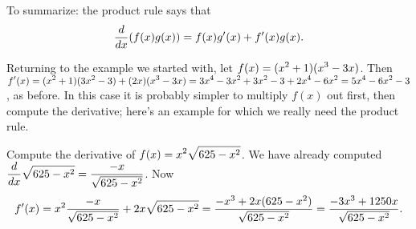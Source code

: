 

To summarize: the product rule says that
$${d\over dx}(f(x)g(x)) = f(x)g'(x) + f'(x)g(x).
$$

Returning to the example we started with, let $\displaystyle f(x)=(x^2+1)(x^3-3x)$.
Then $\displaystyle f'(x)=(x^2+1)(3x^2-3)+(2x)(x^3-3x)=3x^4-3x^2+3x^2-3+2x^4-6x^2=
5x^4-6x^2-3$, as before. In this case it is probably simpler to
multiply $f(x)$ out first, then compute the derivative; here's an
example for which we really need the product rule.

\begin{example} Compute the derivative of $\displaystyle f(x)=x^2\sqrt{625-x^2}$.  We have
already computed $\displaystyle {d\over
  dx}\sqrt{625-x^2}={-x\over\sqrt{625-x^2}}$.  Now
$$f'(x)=x^2{-x\over\sqrt{625-x^2}}+2x\sqrt{625-x^2}=
{-x^3+2x(625-x^2)\over \sqrt{625-x^2}}=
{-3x^3+1250x\over \sqrt{625-x^2}}.
$$
\vskip-10pt\end{example}

